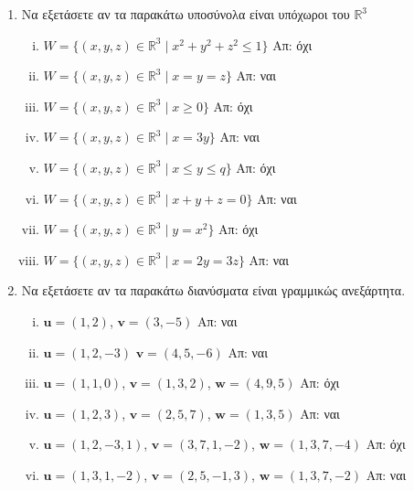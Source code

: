 


\usepackage{anyfontsize}
\pagestyle{vangelis}


\begin{center}
\end{center}

\vspace{\baselineskip}

\begin{enumerate}

	\item Να εξετάσετε αν τα παρακάτω υποσύνολα είναι υπόχωροι του $\mathbb{R}^{3}$ 
        \begin{enumerate}[(i)]
			\item $ W = \{ (x,y,z) \in \mathbb{R}^{3} \mid x^{2} + y^{2} + z^{2} \leq 1  \} $ \hfill
				Απ: όχι
			\item $ W = \{ (x,y,z) \in \mathbb{R}^{3} \mid x = y = z \} $ \hfill Απ: ναι
			\item $ W = \{ (x,y,z) \in \mathbb{R}^{3} \mid x\geq 0 \} $ \hfill Απ:  όχι
			\item $ W = \{ (x,y,z) \in \mathbb{R}^{3} \mid x = 3y \} $ \hfill Απ: ναι
			\item $ W = \{ (x,y,z) \in \mathbb{R}^{3} \mid x \leq y \leq q \} $ \hfill Απ: όχι
			\item $ W = \{ (x,y,z) \in \mathbb{R}^{3} \mid x + y + z = 0 \} $ \hfill Απ: ναι
			\item $ W = \{ (x,y,z) \in \mathbb{R}^{3} \mid y = x^{2} \} $ \hfill Απ: όχι 
			\item $ W = \{ (x,y,z) \in \mathbb{R}^{3} \mid x = 2y = 3z \} $ \hfill Απ: ναι 
		\end{enumerate}

	\item Να εξετάσετε αν τα παρακάτω διανύσματα είναι γραμμικώς ανεξάρτητα.
		\begin{enumerate}[(i)]
			\item $ \mathbf{u} = (1,2) $, $ \mathbf{v} = (3,-5) $ \hfill Απ: ναι
			\item $ \mathbf{u} = (1,2,-3) $ $ \mathbf{v} = (4,5,-6) $ \hfill Απ: ναι
			\item $ \mathbf{u} = (1,1,0)$, $ \mathbf{v} = (1,3,2)$, $ \mathbf{w} = (4,9,5) $ \hfill Απ: όχι 
			\item $ \mathbf{u} = (1,2,3)$, $ \mathbf{v} = (2,5,7)$, $ \mathbf{w} = (1,3,5) $ \hfill Απ: ναι 
			\item $ \mathbf{u} = (1,2,-3,1) $, $ \mathbf{v} = (3,7,1,-2) $, $ \mathbf{w} =
				(1,3,7,-4) $ \hfill Απ: όχι
			\item $ \mathbf{u} = (1,3,1,-2) $, $ \mathbf{v} = (2,5,-1,3) $, $ \mathbf{w} =
				(1,3,7,-2) $ \hfill Απ: ναι
		\end{enumerate}


\end{enumerate}
